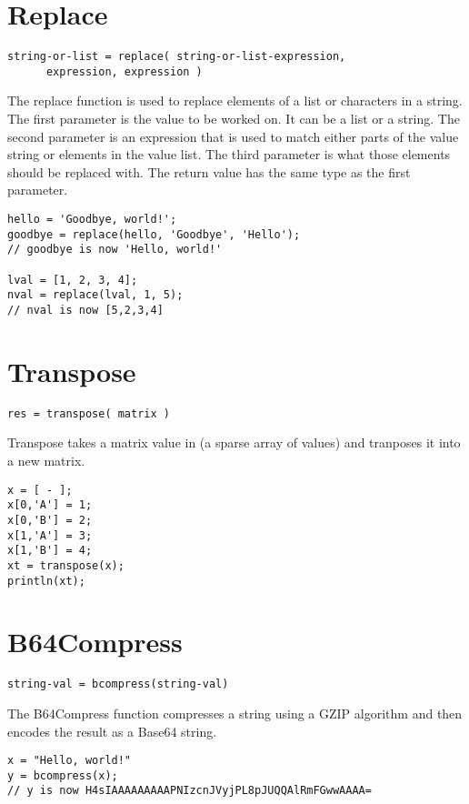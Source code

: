 \section{Replace}
\begin{Verbatim}
string-or-list = replace( string-or-list-expression,
      expression, expression )
\end{Verbatim}

The replace function is used to replace elements of a list or characters in a string. The
first parameter is the value to be worked on. It can be a list or a string. The second parameter is
an expression that is used to match either parts of the value string or elements in the value list. The third
parameter is what those elements should be replaced with. The return value has the same type
as the first parameter.

\begin{lstlisting}[caption={replace example}]
hello = 'Goodbye, world!';
goodbye = replace(hello, 'Goodbye', 'Hello');
// goodbye is now 'Hello, world!'

lval = [1, 2, 3, 4];
nval = replace(lval, 1, 5);
// nval is now [5,2,3,4]
\end{lstlisting}

\section{Transpose}
\begin{Verbatim}
res = transpose( matrix )
\end{Verbatim}

Transpose takes a matrix value in \Reflex (a sparse array of values) and tranposes it
into a new matrix.

\begin{lstlisting}[caption={tranpose example}]
x = [ - ];
x[0,'A'] = 1;
x[0,'B'] = 2;
x[1,'A'] = 3;
x[1,'B'] = 4;
xt = transpose(x);
println(xt);

\end{lstlisting}

\section{B64Compress}
\begin{Verbatim}
string-val = bcompress(string-val)
\end{Verbatim}

The B64Compress function compresses a string using a GZIP algorithm and then encodes the result as a Base64 string.
\begin{lstlisting}[caption={bcompress example}]
x = "Hello, world!"
y = bcompress(x);
// y is now H4sIAAAAAAAAAPNIzcnJVyjPL8pJUQQAlRmFGwwAAAA=

\end{lstlisting}

